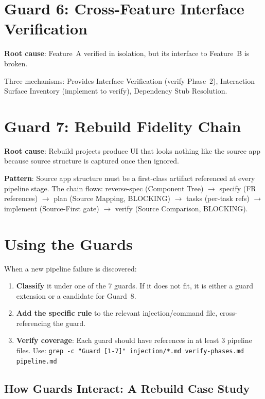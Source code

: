 \documentclass[11pt,a4paper,openright,twoside]{report}
\begin{document}
\section{Guard 6: Cross-Feature Interface Verification}

\textbf{Root cause}: Feature~A verified in isolation, but its interface to Feature~B is broken.

Three mechanisms: Provides Interface Verification (verify Phase~2), Interaction Surface Inventory (implement to verify), Dependency Stub Resolution.

\section{Guard 7: Rebuild Fidelity Chain}

\textbf{Root cause}: Rebuild projects produce UI that looks nothing like the source app because source structure is captured once then ignored.

\textbf{Pattern}: Source app structure must be a first-class artifact referenced at every pipeline stage. The chain flows: reverse-spec (Component Tree) $\rightarrow$ specify (FR references) $\rightarrow$ plan (Source Mapping, BLOCKING) $\rightarrow$ tasks (per-task refs) $\rightarrow$ implement (Source-First gate) $\rightarrow$ verify (Source Comparison, BLOCKING).

\section{Using the Guards}

When a new pipeline failure is discovered:

\begin{enumerate}
  \item \textbf{Classify} it under one of the 7 guards. If it does not fit, it is either a guard extension or a candidate for Guard~8.
  \item \textbf{Add the specific rule} to the relevant injection/command file, cross-referencing the guard.
  \item \textbf{Verify coverage}: Each guard should have references in at least 3 pipeline files. Use: \texttt{grep -c "Guard [1-7]" injection/*.md verify-phases.md pipeline.md}
\end{enumerate}

\subsection{How Guards Interact: A Rebuild Case Study}
\end{document}
